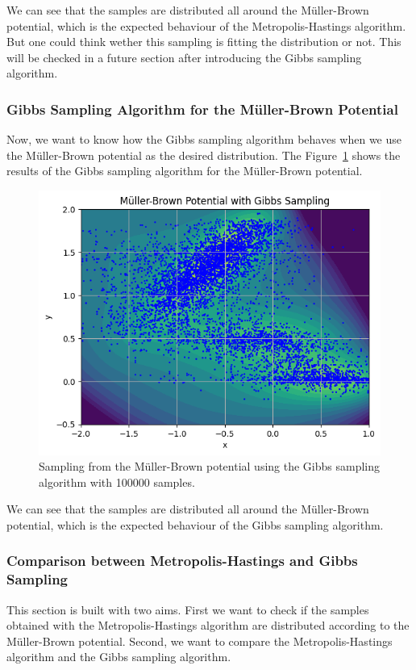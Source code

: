 \documentclass{report}
\begin{document}
We can see that the samples are distributed all around the Müller-Brown potential, which is the expected behaviour of the Metropolis-Hastings algorithm. But one could think wether this sampling is fitting the distribution or not. This will be checked in a future section after introducing the Gibbs sampling algorithm.


\subsubsection{Gibbs Sampling Algorithm for the Müller-Brown Potential}
\label{sec:gibbs_muller_brown}

Now, we want to know how the Gibbs sampling algorithm behaves when we use the Müller-Brown potential as the desired distribution. The Figure~\ref{fig:mullerbrowngibbs} shows the results of the Gibbs sampling algorithm for the Müller-Brown potential.

\begin{figure}[H]
	\centering
	\includegraphics[width=0.5\linewidth]{./Figures/MCMC/mullerbrowngibbs.png}
	\caption{Sampling from the Müller-Brown potential using the Gibbs sampling algorithm with 100000 samples.}
	\label{fig:mullerbrowngibbs}
\end{figure}

We can see that the samples are distributed all around the Müller-Brown potential, which is the expected behaviour of the Gibbs sampling algorithm. 

\subsubsection{Comparison between Metropolis-Hastings and Gibbs Sampling}
\label{sec:comparison_metropolis_gibbs}

This section is built with two aims. First we want to check if the samples obtained with the Metropolis-Hastings algorithm are distributed according to the Müller-Brown potential. Second, we want to compare the Metropolis-Hastings algorithm and the Gibbs sampling algorithm.
\end{document}
